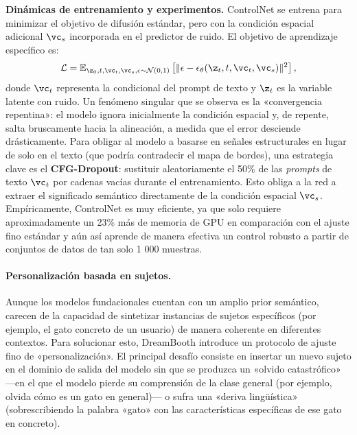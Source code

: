 \documentclass[../../book-main_es.tex]{subfiles}
\begin{document}
\textbf{Dinámicas de entrenamiento y experimentos.}
ControlNet se entrena para minimizar el objetivo de difusión estándar, pero con la condición 
espacial adicional $\vc_s$ incorporada en el predictor de ruido. El objetivo de aprendizaje específico es:
\begin{equation}
    \mathcal{L} = \mathbb{E}_{\z_0, t, \vc_t, \vc_s, \epsilon \sim \mathcal{N}(0,1)} \left[ \| \epsilon - \epsilon_\theta(\z_t, t, \vc_t, \vc_s) \|^2 \right],
\end{equation}
donde $\vc_t$ representa la condicional del prompt de texto y $\z_t$ es la variable latente con 
ruido. Un fenómeno singular que se observa es la «convergencia repentina»: el modelo ignora 
inicialmente la condición espacial y, de repente, salta bruscamente hacia la alineación, a medida que el 
error desciende drásticamente. Para obligar al modelo a basarse en señales estructurales en 
lugar de solo en el texto (que podría contradecir el mapa de bordes), una estrategia clave 
es el \textbf{CFG-Dropout}: sustituir aleatoriamente el 50\% de las \textit{prompts} de 
texto $\vc_t$ por cadenas vacías durante el entrenamiento. Esto obliga a la red a extraer el 
significado semántico directamente de la condición espacial $\vc_s$. Empíricamente,
ControlNet es muy eficiente, ya que solo requiere aproximadamente un 23\% más de 
memoria de GPU en comparación con el ajuste fino estándar y aún así aprende de manera 
efectiva un control robusto a partir de conjuntos de datos de tan solo 1 000 muestras.


\paragraph{Personalización basada en sujetos.}
Aunque los modelos fundacionales cuentan con un amplio prior semántico, carecen de 
la capacidad de sintetizar instancias de sujetos específicos (por ejemplo, el gato concreto de un 
usuario) de manera coherente en diferentes contextos. Para solucionar esto, DreamBooth 
\citep{ruiz2023dreambooth} introduce un protocolo de ajuste fino de «personalización». El principal 
desafío consiste en insertar un nuevo sujeto en el dominio de salida del modelo sin que se 
produzca un «olvido catastrófico» ---en el que el modelo pierde su comprensión de la clase general 
(por ejemplo, olvida cómo es un gato en general)--- o sufra una «deriva lingüística» (sobrescribiendo 
la palabra «gato» con las características específicas de ese gato en concreto).
\end{document}

